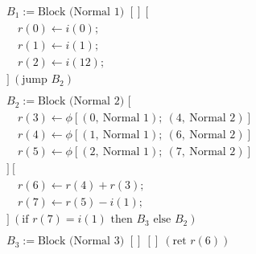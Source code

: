 \begin{figure}[ht]
\centering
\begin{minipage}{0.45\textwidth}

\[
\renewcommand{\arraystretch}{1}
\begin{array}{l}
B_1 := \text{Block (Normal 1) } [] \ [ \\
\quad r(0) \leftarrow i(0); \\
\quad r(1) \leftarrow i(1); \\
\quad r(2) \leftarrow i(12); \\
] \ (\text{jump } B_2) \\
\\
B_2 := \text{Block (Normal 2) } [ \\
\quad r(3) \leftarrow \phi[(0, \ \text{Normal 1}); \ (4, \ \text{Normal 2})] \\
\quad r(4) \leftarrow \phi[(1, \ \text{Normal 1}); \ (6, \ \text{Normal 2})] \\
\quad r(5) \leftarrow \phi[(2, \ \text{Normal 1}); \ (7, \ \text{Normal 2})] \\
] \ [ \\
\quad r(6) \leftarrow r(4) + r(3); \\
\quad r(7) \leftarrow r(5) - i(1); \\
] \ (\text{if } r(7) = i(1) \text{ then } B_3 \text{ else } B_2) \\
\\
B_3 := \text{Block (Normal 3) } [] \ [] \ (\text{ret } r(6)) \\
\end{array}
\]




\end{minipage}
\end{figure}
